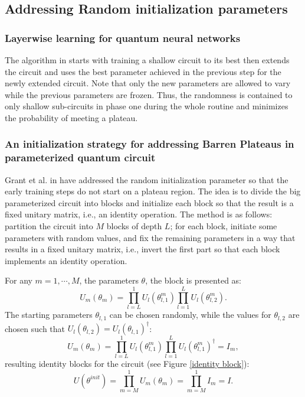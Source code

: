 \subsection{Addressing Random initialization parameters}

\subsubsection{Layerwise learning for quantum neural networks}
The algorithm in \cite{skolikLayerwiseLearningQuantum2021} starts with training a shallow circuit to its best then extends the circuit and uses the best parameter achieved in the previous step for the newly extended circuit. 
Note that only the new parameters are allowed to vary while the previous parameters are frozen.
Thus, the randomness is contained to only shallow sub-circuits in phase one during the whole routine and minimizes the probability of meeting a plateau.


\subsubsection{An initialization strategy for addressing Barren Plateaus in parameterized quantum circuit}

Grant et al. in \cite{grantInitializationStrategyAddressing2019} have addressed the random initialization parameter so that the early training steps do not start on a plateau region. 
The idea is to divide the big parameterized circuit into blocks and initialize each block so that the result is a fixed unitary matrix, i.e., an identity operation. 
The method is as follows: partition the circuit into $M$ blocks of depth $L$; for each block, initiate some parameters with random values, and fix the remaining parameters in a way that results in a fixed unitary matrix, i.e., invert the first part so that each block implements an identity operation.

For any $m = 1, \cdots, M$, the parameters $\theta$, the block is presented as:
\begin{equation}
    U_m(\theta_m)
    = \prod_{l=L}^1 U_l(\theta_{l,1}^m) \prod_{l=1}^L U_l(\theta_{l,2}^m).
\end{equation}
The starting parameters $\theta_{l,1}$ can be chosen randomly, while the values for $\theta_{l,2}$ are chosen such that $U_l(\theta_{l,2}) = U_l(\theta_{l,1})^\dagger$:
\begin{equation}
    U_m(\theta_m)
    = \prod_{l=L}^1 U_l(\theta_{l,1}^m)
    \prod_{l=1}^L U_l(\theta_{l,1}^m)^\dagger
    = I_m,
\end{equation}
resulting identity blocks for the circuit (see Figure \ref{identity block}):
\begin{equation}
    U(\theta^{init})
    = \prod_{m=M}^1 U_m(\theta_m)
    = \prod_{m=M}^1 I_m
    = I.
\end{equation}

